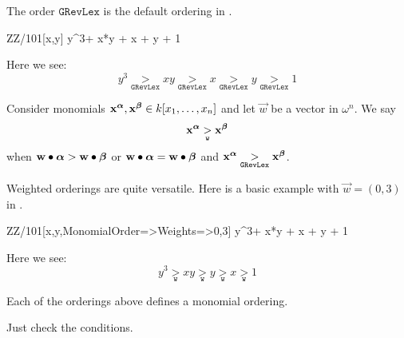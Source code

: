 \documentclass{ximera}
\begin{document}
The order $\mathtt{GRevLex}$ is the default ordering in \macaulay.

\begin{macaulay2}
ZZ/101[x,y]
y^3+ x*y + x + y + 1
\end{macaulay2}

Here we see:
\[
y^3 \underset{\mathtt{GRevLex}}{>} xy \underset{\mathtt{GRevLex}}{>} x  \underset{\mathtt{GRevLex}}{>} y \underset{\mathtt{GRevLex}}{>} 1
\]

\begin{definition}
  Consider monomials $\mathbf{x}^{\boldsymbol\alpha},\mathbf{x}^{\boldsymbol\beta}\in k[x_1,\dots, x_n]$ and
  let $\vec{w}$ be a vector in $\omega^n$. We say
  \[
  \mathbf{x}^{\boldsymbol\alpha} \underset{\mathtt{w}}{>}\mathbf{x}^{\boldsymbol\beta}
  \]
  when $\mathbf{w}\bullet {\boldsymbol\alpha} > \mathbf{w}\bullet {\boldsymbol\beta}$ or $\mathbf{w}\bullet
  {\boldsymbol\alpha} = \mathbf{w}\bullet {\boldsymbol\beta}$ and $\mathbf{x}^{\boldsymbol\alpha}
  \underset{\mathtt{GRevLex}}{>}\mathbf{x}^{\boldsymbol\beta}$.
\end{definition}

Weighted orderings are quite versatile. Here is a basic example with
$\vec{w} = (0,3)$ in \macaulay.

\begin{macaulay2}
ZZ/101[x,y,MonomialOrder=>{Weights=>{0,3}}]
y^3+ x*y + x + y + 1
\end{macaulay2}

Here we see:
\[
y^3 \underset{\mathtt{w}}{>} xy \underset{\mathtt{w}}{>} y \underset{\mathtt{w}}{>} x \underset{\mathtt{w}}{>} 1
\]

\begin{proposition}
  Each of the orderings above defines a monomial ordering.
  \begin{sketch}
    Just check the conditions.
  \end{sketch}
\end{proposition}
\end{document}

